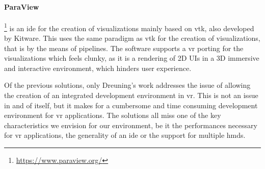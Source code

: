\paragraph{ParaView} \footnote{\url{https://www.paraview.org/}} is an \acrshort{ide} for the creation of visualizations mainly based on \acrshort{vtk}, also developed by Kitware. This uses the same paradigm as \acrshort{vtk} for the creation of visualizations, that is by the means of pipelines. The software supports a \acrshort{vr} porting for the visualizations which feels clunky, as it is a rendering of 2D UIs in a 3D immersive and interactive environment, which hinders user experience.

Of the previous solutions, only Dreuning's work addresses the issue of allowing the creation of an integrated development environment in \acrshort{vr}. This is not an issue in and of itself, but it makes for a cumbersome and time consuming development environment for \acrshort{vr} applications. The solutions all miss one of the key characteristics we envision for our environment, be it the performances necessary for \acrshort{vr} applications, the generality of an \acrshort{ide} or the support for multiple \acrshort{hmd}s.